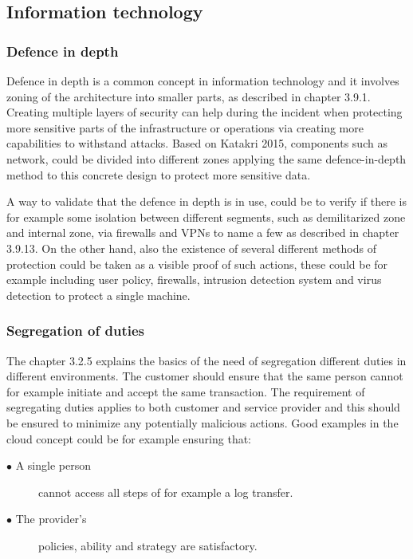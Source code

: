 \documentclass{article}
\begin{document}
\subsection{Information technology}


\subsubsection{Defence in depth}
Defence in depth is a common concept in information technology and it involves zoning of the architecture into smaller parts, as described in chapter 3.9.1. Creating multiple layers of security can help during the incident when protecting more sensitive parts of the infrastructure or operations via creating more capabilities to withstand attacks.
Based on Katakri 2015, components such as network, could be divided into different zones applying the same defence-in-depth method to this concrete design to protect more sensitive data.
\par
A way to validate that the defence in depth is in use, could be to verify if there is for example some isolation between different segments, such as demilitarized zone and internal zone, via firewalls and VPNs to name a few as described in chapter 3.9.13. On the other hand, also the existence of several different methods of protection could be taken as a visible proof of such actions, these could be for example including user policy, firewalls, intrusion detection system and virus detection to protect a single machine.

\subsubsection{Segregation of duties}
The chapter 3.2.5 explains the basics of the need of segregation different duties in different environments. The customer should ensure that the same person cannot for example initiate and accept the same transaction. The requirement of segregating duties applies to both customer and service provider and this should be ensured to minimize any potentially malicious actions.
Good examples in the cloud concept could be for example ensuring that:
\begin{description}
	\item[$\bullet$ A single person] cannot access all steps of for example a log transfer.
	\item[$\bullet$ The provider's] policies, ability and strategy are satisfactory.
\end{description}
\end{document}
